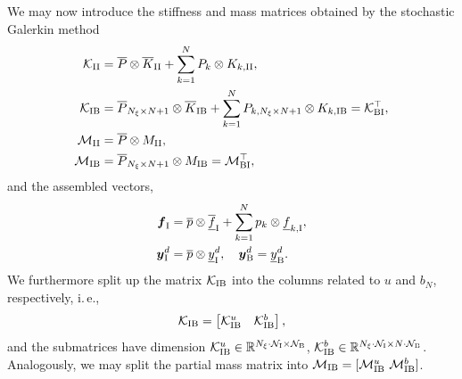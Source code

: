 \documentclass[a4paper,10pt]{article}
\newcommand{\cK}{{\mathcal{K}}}
\newcommand{\cM}{{\mathcal{M}}}
\newcommand{\R}{{\mathbb{R}}}
\newcommand{\N}{{\mathcal{N}}}
\numberwithin{theorem}{section}
\begin{document}
We may now introduce the stiffness and mass matrices obtained by the stochastic Galerkin method 
\begin{subequations}
    \label{eq:kronecker_matrices}
\begin{align}
  \mathcal K_{\textup{II}} &= \overline P\otimes \overline K_{\textup{II}} + \sum_{k=1}^N P_k \otimes K_{k,\textup{II}},
\label{eq:kronecker_matrices_II}\\
  \cK_{\textup{IB}} &= \overline P_{N_{\xi}\times N+1} \otimes \overline K_{\textup{IB}}
                      + \sum_{k=1}^N P_{k,N_{\xi}\times N+1} \otimes K_{k,\textup{IB}} = \mathcal{K}_{\textup{BI}}^\top,\\  
  \cM_{\textup{II}} &= \overline P\otimes M_{\textup{II}}, \\
  \cM_{\textup{IB}} &= \overline P_{N_{\xi}\times N+1}\otimes M_{\text{IB}}=\cM_{\textup{BI}}^\top,%
\end{align}
\end{subequations}
and  the assembled vectors,
\begin{subequations}
\begin{align}
  \label{eq:rhs_assembled}
  \boldsymbol{f}_{\textup{I}} &= \overline p \otimes \underline{\overline{f}}_\textup{I} + \sum_{k=1}^N p_k\otimes \underline{f}_{k,\textup{I}},
  \\
  \boldsymbol{y}^d_{\textup{I}} &= \overline p\otimes \underline{y}^d_\textup{I} ,\quad \boldsymbol{y}^d_{\textup{B}} = \underline y^d_{\textup{B}}.
\end{align}
\end{subequations}
We furthermore split up the matrix $\mathcal K_{\textup{IB}}$ into the columns related to $u$ and $b_N$, respectively, i.\,e.,
\begin{equation*}
  \mathcal K_{\textup{IB}} = \begin{bmatrix} \mathcal K_{\textup{IB}}^u & \mathcal K_{\textup{IB}}^b\end{bmatrix}, 
\end{equation*}
and the submatrices have dimension $\cK_{\textup{IB}}^u \in \R^{N_{\xi}\cdot\N_{\textup{I}}\times \N_{\textup{B}}}$, $\cK_{\textup{IB}}^b\in \R^{N_{\xi}\cdot\N_{\textup{I}}\times N\cdot\N_{\textup{B}}}$. Analogously, we may split the partial mass matrix into $\mathcal M_{\textup{IB}} = [\mathcal M_{\textup{IB}}^u\ \mathcal M_{\textup{IB}}^b]$.
\end{document}
